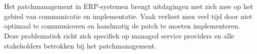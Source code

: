 
\chapter{}%
\label{ch:inleiding}




\section{}%
\label{sec:probleemstelling}

Het patchmanagement in ERP-systemen brengt uitdagingen met zich mee op het gebied van communicatie en implementatie. Vaak verliest men veel tijd door niet optimaal te communiceren en handmatig de patch te moeten implementeren. Deze problematiek richt zich specifiek op managed service providers en alle stakeholders betrokken bij het patchmanagement.

\section{}%
\label{sec:onderzoeksvraag}

